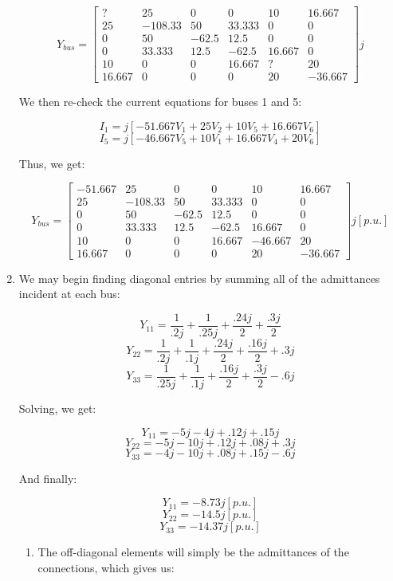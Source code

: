 \begin{enumerate}
    $$Y_{bus}=\left[ \begin{matrix} ? & 25 & 0 & 0 & 10 & 16.667\\ 25 & -108.33 & 50 & 33.333 & 0 & 0\\ 0 & 50 & -62.5 & 12.5 & 0 & 0\\ 0 & 33.333 & 12.5 & -62.5 & 16.667 & 0\\ 10 & 0 & 0 & 16.667 & ? & 20\\ 16.667 & 0 & 0 & 0 & 20 & -36.667 \end{matrix} \right]j$$

    We then re-check the current equations for buses 1 and 5:

    $$I_1=j[-51.667V_1+25V_2+10V_5+16.667V_6]$$
    $$I_5=j[-46.667V_5+10V_1+16.667V_4+20V_6]$$

    Thus, we get: 

    $$\boxed{Y_{bus}=\left[ \begin{matrix} -51.667 & 25 & 0 & 0 & 10 & 16.667\\ 25 & -108.33 & 50 & 33.333 & 0 & 0\\ 0 & 50 & -62.5 & 12.5 & 0 & 0\\ 0 & 33.333 & 12.5 & -62.5 & 16.667 & 0\\ 10 & 0 & 0 & 16.667 & -46.667 & 20\\ 16.667 & 0 & 0 & 0 & 20 & -36.667 \end{matrix} \right]j[p.u.]}$$

  \item

    We may begin finding diagonal entries by summing all of the admittances incident at each bus:

    $$Y_{11}=\frac{1}{.2j}+\frac{1}{.25j}+\frac{.24j}{2}+\frac{.3j}{2}$$
    $$Y_{22}=\frac{1}{.2j}+\frac{1}{.1j}+\frac{.24j}{2}+\frac{.16j}{2}+.3j$$
    $$Y_{33}=\frac{1}{.25j}+\frac{1}{.1j}+\frac{.16j}{2}+\frac{.3j}{2}-.6j$$

    Solving, we get:

    $$Y_{11}=-5j-4j+.12j+.15j$$
    $$Y_{22}=-5j-10j+.12j+.08j+.3j$$
    $$Y_{33}=-4j-10j+.08j+.15j-.6j$$

    And finally:

    $$Y_{11}=-8.73j[p.u.]$$
    $$Y_{22}=-14.5j[p.u.]$$
    $$Y_{33}=-14.37j[p.u.]$$

    \begin{enumerate}

      \item The off-diagonal elements will simply be the admittances of the connections, which gives us:


\end{enumerate}
\end{enumerate}

